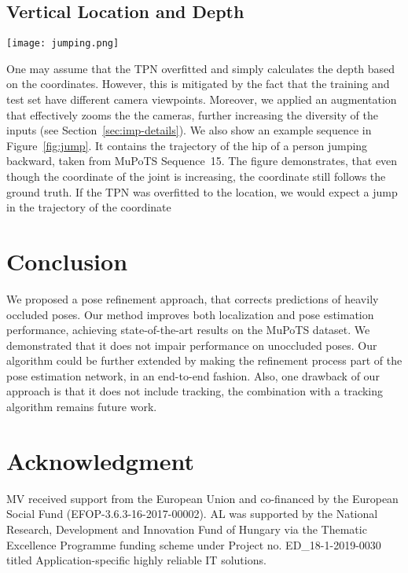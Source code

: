 \documentclass[runningheads, envcountsame, a4paper]{llncs}
\begin{document}
\subsection{Vertical Location and Depth}
\begin{figure*}[t]
\begin{center}
\texttt{[image: jumping.png]}
\end{center}
\caption{\textbf{Trajectory of hip during a jump.} During a jump, the trajectory follows the ground-truth, showing that the model did not overfit to vertical location. Left plot shows the vertical coordinate of the hip in a camera centered coordinate system. The right plot shows the depth of the joint.}
\label{fig:jump}
\end{figure*}
One may assume that the TPN overfitted and simply calculates the depth based on the  coordinates. However, this is mitigated by the fact that the training and test set have different camera viewpoints. Moreover, we applied an augmentation that effectively zooms the the cameras, further increasing the diversity of the inputs (see Section~\ref{sec:imp-details}). We also show an example sequence in Figure~\ref{fig:jump}. It contains the trajectory of the hip of a person jumping backward, taken from MuPoTS Sequence~15. The figure demonstrates, that even though the  coordinate of the joint is increasing, the  coordinate still follows the ground truth. If the TPN was overfitted to the  location, we would expect a jump in the trajectory of the  coordinate

\section{Conclusion}
We proposed a pose refinement approach, that corrects predictions of heavily occluded poses. Our method improves both localization and pose estimation performance, achieving state-of-the-art results on the MuPoTS dataset. We demonstrated that it does not impair performance on unoccluded poses. Our algorithm could be further extended by making the refinement process part of the pose estimation network, in an end-to-end fashion. Also, one drawback of our approach is that it does not include tracking, the combination with a tracking algorithm remains future work.

\section*{Acknowledgment}
 MV received support from the European Union and co-financed by the European Social Fund (EFOP-3.6.3-16-2017-00002). AL was supported by the National Research, Development and Innovation Fund of Hungary via the Thematic Excellence Programme funding scheme under Project no. ED\_18-1-2019-0030 titled Application-specific highly reliable IT solutions. 
\end{document}
